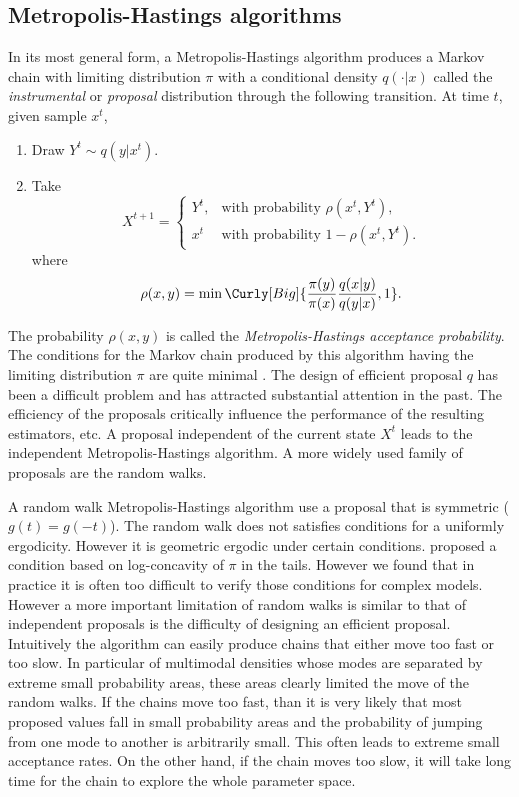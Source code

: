 \documentclass[11pt, hyper, bib, fontset=Minion]{marticle}
\begin{document}
\subsection{Metropolis-Hastings algorithms}
\label{sub:Metropolis-Hastings algorithms}

In its most general form, a Metropolis-Hastings algorithm produces a Markov
chain with limiting distribution $\pi$ with a conditional density $q(\cdot|x)$
called the \emph{instrumental} or \emph{proposal} distribution through the
following transition. At time $t$, given sample $x^t$,
\begin{enumerate}
  \item Draw $Y^t \sim q(y|x^t)$.
  \item Take
    \begin{equation*}
      X^{t+1} =
      \begin{cases}
        Y^t, &\text{with probability } \rho(x^t,Y^t),\\
        x^t  &\text{with probability } 1 - \rho(x^t,Y^t).
      \end{cases}
    \end{equation*}
    where
    \begin{equation}
      \rho(x,y) =
      \min\Curly[Big]{\frac{\pi(y)}{\pi(x)}\frac{q(x|y)}{q(y|x)},1}.
    \end{equation}
\end{enumerate}
The probability $\rho(x,y)$ is called the \emph{Metropolis-Hastings acceptance
  probability}. The conditions for the Markov chain produced by this algorithm
having the limiting distribution $\pi$ are quite minimal
\parencite[see][chap.~7]{Robert:2004tn}. The design of efficient proposal $q$
has been a difficult problem and has attracted substantial attention in the
past. The efficiency of the proposals critically influence the performance of
the resulting estimators, etc. A proposal independent of the current state
$X^t$ leads to the independent Metropolis-Hastings algorithm. A more widely
used family of proposals are the random walks.

A random walk Metropolis-Hastings algorithm use a proposal that is symmetric
($g(t) = g(-t)$). The random walk does not satisfies conditions for a
uniformly ergodicity. However it is geometric ergodic under certain
conditions. \textcite{Mengersen:1996th} proposed a condition based on
log-concavity of $\pi$ in the tails. However we found that in practice it is
often too difficult to verify those conditions for complex models. However a
more important limitation of random walks is similar to that of independent
proposals is the difficulty of designing an efficient proposal.  Intuitively
the algorithm can easily produce chains that either move too fast or too slow.
In particular of multimodal densities whose modes are separated by extreme
small probability areas, these areas clearly limited the move of the random
walks. If the chains move too fast, than it is very likely that most proposed
values fall in small probability areas and the probability of jumping from one
mode to another is arbitrarily small. This often leads to extreme small
acceptance rates. On the other hand, if the chain moves too slow, it will take
long time for the chain to explore the whole parameter space.
\end{document}
